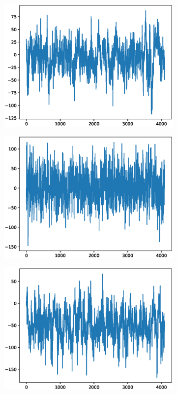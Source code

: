 \documentclass[12pt]{article}
\begin{document}
\begin{figure}
\begin{subfigure}{.25\textwidth}
  \centering
  \includegraphics[width=.8\linewidth]{figures/signals/A/Z015.eps}
\end{subfigure}%
\begin{subfigure}{.25\textwidth}
  \centering
  \includegraphics[width=.8\linewidth]{figures/signals/A/Z024.eps}
\end{subfigure}
\begin{subfigure}{.25\textwidth}
  \centering
  \includegraphics[width=.8\linewidth]{figures/signals/A/Z028.eps}

\end{subfigure}
\end{figure}
\end{document}
